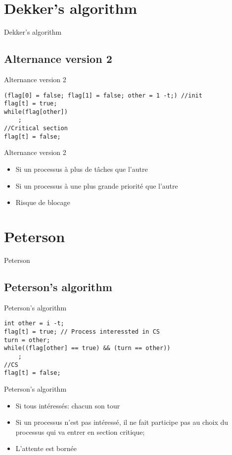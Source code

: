 \def\sectitle{Dekker's algorithm}
\section{\sectitle}
\begin{frame}[containsverbatim]{\sectitle}
\def\subsectitle{Alternance version 2}
\subsection{\subsectitle}

\begin{exampleblock}{\subsectitle}
\begin{verbatim}
(flag[0] = false; flag[1] = false; other = 1 -t;) //init
flag[t] = true;
while(flag[other])
    ;
//Critical section
flag[t] = false;
\end{verbatim}
\end{exampleblock}

\begin{alertblock}{\subsectitle}
\begin{itemize}
    \item Si un processus à plus de tâches que l'autre
    \item Si un processus à une plus grande priorité que l'autre
    \item Risque de blocage
\end{itemize}
\end{alertblock}

\end{frame}


\def\sectitle{Peterson}
\section{\sectitle}
\begin{frame}[containsverbatim]{\sectitle}
\def\subsectitle{Peterson's algorithm}
\subsection{\subsectitle}
\begin{exampleblock}{\subsectitle}
\begin{verbatim}
int other = i -t;
flag[t] = true; // Process interessted in CS
turn = other;
while((flag[other] == true) && (turn == other))
    ;
//CS
flag[t] = false;
\end{verbatim}
\end{exampleblock}


\begin{alertblock}{\subsectitle}
\begin{itemize}
    \item Si tous intéressés: chacun son tour
    \item Si un processus n'est pas intéressé, il ne fait participe pas au choix
    du processus qui va entrer en section critique;
    \item L'attente est bornée
\end{itemize}
\end{alertblock}
\end{frame}

